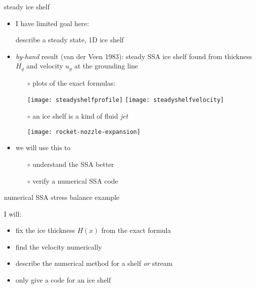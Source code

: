\begin{frame}{steady ice shelf}

\begin{itemize}
\item I have limited goal here:

\begin{center}
\alert{describe a steady state, 1D ice shelf}
\end{center}
\item \emph{by-hand} result (van der Veen 1983): steady SSA ice shelf found from thickness $H_g$ and velocity $u_g$ at the grounding line
   \begin{itemize}
   \item[$\circ$] plots of the exact formulas:

\begin{center}
  \texttt{[image: steadyshelfprofile]} \qquad \qquad
  \texttt{[image: steadyshelfvelocity]}
\end{center}

\vspace{-2mm}
   \item[$\circ$] an ice shelf is a kind of fluid \emph{jet}

   \hfill \texttt{[image: rocket-nozzle-expansion]}
   \end{itemize}

\vspace{-9mm}
\item we will use this to
  \begin{itemize}
  \item[$\circ$] understand the SSA better
  \item[$\circ$] verify a numerical SSA code
  \end{itemize}
\end{itemize}
\end{frame}


\begin{frame}{numerical SSA stress balance example}

I will:
\begin{itemize}
\item fix the ice thickness $H(x)$ from the exact formula
\item find the velocity numerically
\item describe the numerical method for a shelf \emph{or} stream
\item only give a code for an ice shelf
\end{itemize}
\end{frame}


